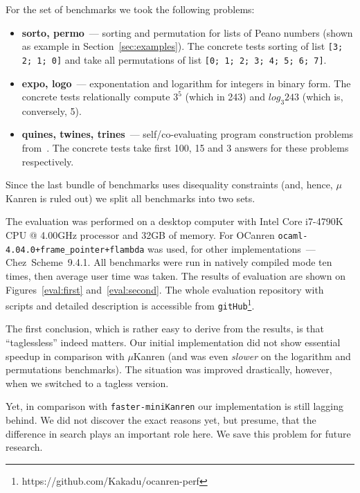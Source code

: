 For the set of benchmarks we took the following problems:

\begin{itemize}
\item \textbf{sorto, permo}~--- sorting and permutation for lists of Peano numbers (shown as example in Section~\ref{sec:examples}).
The concrete tests sorting of list \lstinline{[3; 2; 1; 0]} and take all permutations of list \lstinline{[0; 1; 2; 3; 4; 5; 6; 7]}.
\item \textbf{expo, logo}~--- exponentation and logarithm for integers in binary form. The concrete tests relationally compute
$3^5$ (which in 243) and $log_3 243$ (which is, conversely, 5).
\item \textbf{quines, twines, trines}~--- self/co-evaluating program construction problems from~\cite{Untagged}. The
concrete tests take first 100, 15 and 3 answers for these problems respectively.
\end{itemize}

Since the last bundle of benchmarks uses disequality constraints (and, hence, $\mu$Kanren is ruled out) we
split all benchmarks into two sets.

The evaluation was performed on a desktop computer with Intel Core i7-4790K CPU @ 4.00GHz processor and 32GB of memory.
For OCanren \mbox{\texttt{ocaml-4.04.0+frame_pointer+flambda}} was used, for other implementations~--- Chez~Scheme~9.4.1.
All benchmarks were run in natively compiled mode ten times, then average user time was taken. The results of evaluation
are shown on Figures~\ref{eval:first} and~\ref{eval:second}. The whole evaluation repository with scripts and detailed
description is accessible from \lstinline{gitHub}\footnote{https://github.com/Kakadu/ocanren-perf}.

The first conclusion, which is rather easy to derive from the results, is that ``taglessless'' indeed matters. Our initial
implementation did not show essential speedup in comparison with $\mu$Kanren (and was even \emph{slower} on the logarithm
and permutations benchmarks). The situation was improved drastically, however, when we switched to a tagless version.

Yet, in comparison with \texttt{faster-miniKanren} our implementation is still lagging behind. We did not discover the exact
reasons yet, but presume, that the difference in search plays an important role here.
We save this problem for future research.
